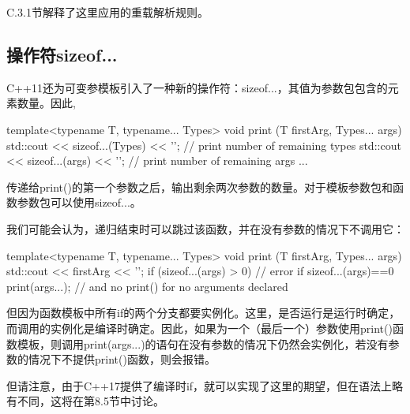 C.3.1节解释了这里应用的重载解析规则。

\subsection{操作符sizeof...}

C++11还为可变参模板引入了一种新的操作符：sizeof...，其值为参数包包含的元素数量。因此,

\begin{cpp}
template<typename T, typename... Types>
void print (T firstArg, Types... args)
{
	std::cout << sizeof...(Types) << '\n'; // print number of remaining types
	std::cout << sizeof...(args) << '\n'; // print number of remaining args
	...
}
\end{cpp}

传递给print()的第一个参数之后，输出剩余两次参数的数量。对于模板参数包和函数参数包可以使用sizeof...。

我们可能会认为，递归结束时可以跳过该函数，并在没有参数的情况下不调用它：

\begin{cpp}
template<typename T, typename... Types>
void print (T firstArg, Types... args)
{
	std::cout << firstArg << '\n';
	if (sizeof...(args) > 0) { // error if sizeof...(args)==0
		print(args...); // and no print() for no arguments declared
	}
}
\end{cpp}

但因为函数模板中所有if的两个分支都要实例化。这里，是否运行是运行时确定，而调用的实例化是编译时确定。因此，如果为一个（最后一个）参数使用print()函数模板，则调用print(args...)的语句在没有参数的情况下仍然会实例化，若没有参数的情况下不提供print()函数，则会报错。

但请注意，由于C++17提供了编译时if，就可以实现了这里的期望，但在语法上略有不同，这将在第8.5节中讨论。
























